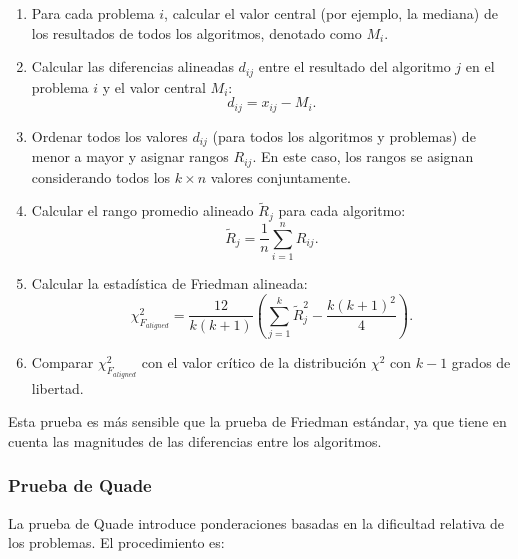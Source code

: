 \begin{enumerate}
    \item Para cada problema $i$, calcular el valor central (por ejemplo, la mediana) de los resultados de todos los algoritmos, denotado como $M_i$.

    \item Calcular las diferencias alineadas $d_{ij}$ entre el resultado del algoritmo $j$ en el problema $i$ y el valor central $M_i$:
    \[
    d_{ij} = x_{ij} - M_i.
    \]

    \item Ordenar todos los valores $d_{ij}$ (para todos los algoritmos y problemas) de menor a mayor y asignar rangos $R_{ij}$. En este caso, los rangos se asignan considerando todos los $k \times n$ valores conjuntamente.

    \item Calcular el rango promedio alineado $\tilde{R}_j$ para cada algoritmo:
    \[
    \tilde{R}_j = \frac{1}{n} \sum_{i=1}^{n} R_{ij}.
    \]

    \item Calcular la estadística de Friedman alineada:
    \[
    \chi^2_{F_{aligned}} = \frac{12}{k(k+1)} \left( \sum_{j=1}^{k} \tilde{R}_j^2 - \frac{k(k+1)^2}{4} \right).
    \]

    \item Comparar $\chi^2_{F_{aligned}}$ con el valor crítico de la distribución $\chi^2$ con $k-1$ grados de libertad.
\end{enumerate}

Esta prueba es más sensible que la prueba de Friedman estándar, ya que tiene en cuenta las magnitudes de las diferencias entre los algoritmos.

\subsubsection{Prueba de Quade}

La prueba de Quade introduce ponderaciones basadas en la dificultad relativa de los problemas. El procedimiento es:

